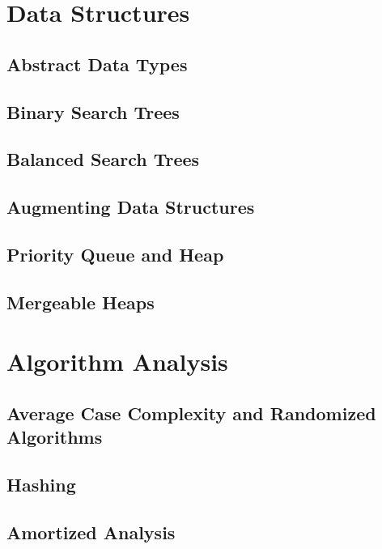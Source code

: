\documentclass[11pt,fleqn,dvipsnames]{book} %
\begin{document}
\part{Data Structures}

\chapter{Abstract Data Types}


\chapter{Binary Search Trees}


\chapter{Balanced Search Trees}





\chapter{Augmenting Data Structures}


\chapter{Priority Queue and Heap}


\chapter{Mergeable Heaps}


\part{Algorithm Analysis}

\chapter{Average Case Complexity and Randomized Algorithms}


\chapter{Hashing}


\chapter{Amortized Analysis}

\end{document}
